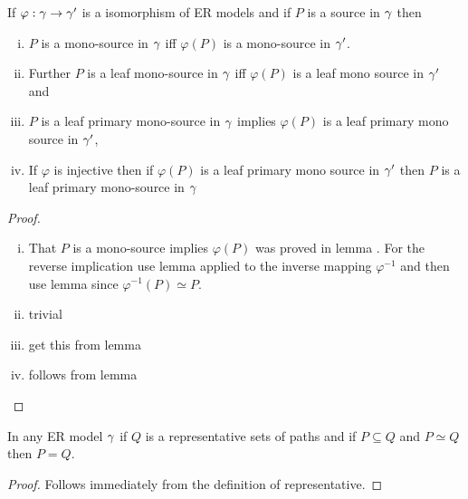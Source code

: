 \begin{lemma}
If $\varphi: \gamma \rightarrow \gamma'$ is a isomorphism of ER models and
if $P$ is a source in $\gamma$ then 
\begin{enumerate}[(i)]
\item
$P$ is a mono-source in $\gamma$ iff  $\varphi(P)$ is a mono-source in $\gamma'$. 
\item
Further  $P$ is a leaf mono-source in $\gamma$ iff $\varphi(P)$ is a leaf mono source in $\gamma'$ and 
\item
$P$ is a leaf primary mono-source in $\gamma$ implies  $\varphi(P)$ is a leaf primary mono source in $\gamma'$,
\item
If $\varphi$ is injective then
if $\varphi(P)$ is a leaf primary mono source in $\gamma'$ then $P$ is a leaf primary mono-source in $\gamma$
\end{enumerate}
\end{lemma}
\begin{proof}

\begin{enumerate} [(i)]
\item
That $P$ is a mono-source implies $\varphi(P)$ was proved
in lemma . For the reverse implication use 
lemma  applied to the inverse mapping $\varphi^{-1}$
and then use lemma  since $\varphi^{-1}(P) \simeq P$.
\item
trivial
\item
get this from lemma  
\item
follows from lemma 
\end{enumerate}

\end{proof}

\begin{lemma}
In any ER model $\gamma$ if $Q$ is a representative sets of paths and if $P \subseteq Q$ and $P \simeq Q$ then $P=Q$.
\end{lemma}
\begin{proof}
Follows immediately from the definition of representative.
\end{proof}


